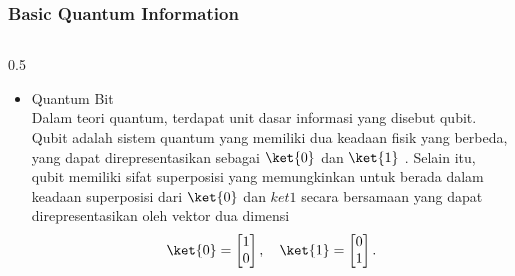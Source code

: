 \begin{frame}
\frametitle{Basic Quantum Information}
    \begin{columns}
        \begin{column}{0.5\textwidth}
            \begin{itemize}\tiny 
                \item Quantum Bit \\
                    \justifying 
                    Dalam teori quantum, terdapat unit dasar informasi yang disebut qubit. Qubit adalah sistem quantum yang memiliki dua keadaan fisik yang berbeda, yang dapat direpresentasikan sebagai \(\ket{0}\) dan \(\ket{1}\) \cite{barnett2009quantum}. Selain itu, qubit memiliki sifat superposisi yang memungkinkan untuk berada dalam keadaan superposisi dari \(\ket{0}\) dan \(ket{1}\) secara bersamaan yang dapat direpresentasikan oleh vektor dua dimensi
                        \begin{equation}
                            \ket{0} = 
                                        \begin{bmatrix}
                                            1 \\
                                            0
                                        \end{bmatrix},
                            \quad
                            \ket{1} = 
                                        \begin{bmatrix}
                                            0 \\
                                            1
                                        \end{bmatrix}.
                            \label{eq:ketket0}
                        \end{equation}
                

\end{itemize}
\end{column}
\end{columns}
\end{frame}
